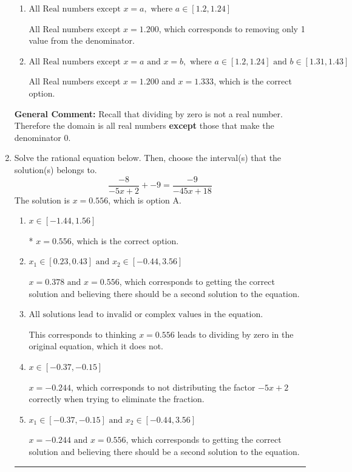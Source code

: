 \documentclass{extbook}[14pt]
\newcommand{\litem}[1]{\item #1

\rule{\textwidth}{0.4pt}}
\begin{document}
\begin{enumerate}
{\begin{enumerate}[label=\Alph*.]
All Real numbers except $x = 12.000$ and $x = 30.000$, which corresponds to not factoring the denominator correctly.
\item \( \text{All Real numbers except } x = a, \text{ where } a \in [1.2, 1.24] \)

All Real numbers except $x = 1.200$, which corresponds to removing only 1 value from the denominator.
\item \( \text{All Real numbers except } x = a \text{ and } x = b, \text{ where } a \in [1.2, 1.24] \text{ and } b \in [1.31, 1.43] \)

All Real numbers except $x = 1.200$ and $x = 1.333$, which is the correct option.
\end{enumerate}

\textbf{General Comment:} Recall that dividing by zero is not a real number. Therefore the domain is all real numbers \textbf{except} those that make the denominator 0.
}
\litem{
Solve the rational equation below. Then, choose the interval(s) that the solution(s) belongs to.
\[ \frac{-8}{-5x + 2} + -9 = \frac{-9}{-45x + 18} \]The solution is \( x = 0.556 \), which is option A.\begin{enumerate}[label=\Alph*.]
\item \( x \in [-1.44,1.56] \)

* $x = 0.556$, which is the correct option.
\item \( x_1 \in [0.23, 0.43] \text{ and } x_2 \in [-0.44,3.56] \)

$x = 0.378 \text{ and } x = 0.556$, which corresponds to getting the correct solution and believing there should be a second solution to the equation.
\item \( \text{All solutions lead to invalid or complex values in the equation.} \)

This corresponds to thinking $x = 0.556$ leads to dividing by zero in the original equation, which it does not.
\item \( x \in [-0.37,-0.15] \)

$x = -0.244$, which corresponds to not distributing the factor $-5x + 2$ correctly when trying to eliminate the fraction.
\item \( x_1 \in [-0.37, -0.15] \text{ and } x_2 \in [-0.44,3.56] \)

$x = -0.244 \text{ and } x = 0.556$, which corresponds to getting the correct solution and believing there should be a second solution to the equation.
\end{enumerate}

}
\end{enumerate}
\end{document}
